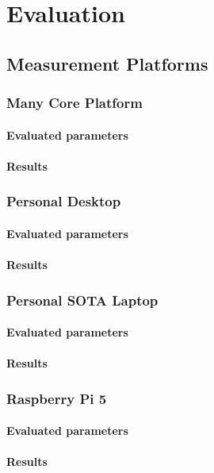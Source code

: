 \chapter{Evaluation}\label{chap:evaluation}

\section{Measurement Platforms}
\subsection{Many Core Platform}
\subsubsection{Evaluated parameters}
\subsubsection{Results}

\subsection{Personal Desktop}
\subsubsection{Evaluated parameters}
\subsubsection{Results}

\subsection{Personal SOTA Laptop}
\subsubsection{Evaluated parameters}
\subsubsection{Results}

\subsection{Raspberry Pi 5}
\subsubsection{Evaluated parameters}
\subsubsection{Results}


